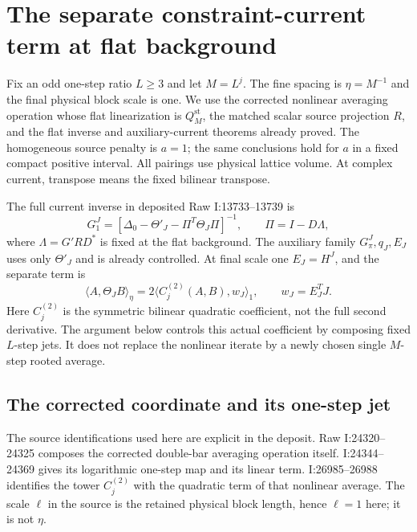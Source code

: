 \documentclass[11pt]{article}
\theoremstyle{remark}\newtheorem{remark}[theorem]{Remark}
\newcommand{\norm}[1]{\left\lVert#1\right\rVert}
\begin{document}

\section{The separate constraint-current term at flat background}
\label{fc-section}

Fix an odd one-step ratio $L\ge3$ and let $M=L^j$.
The fine spacing is $\eta=M^{-1}$ and the final physical block
scale is one. We use the corrected nonlinear averaging operation
whose flat linearization is $Q_M^{\mathrm{st}}$, the matched scalar
source projection $R$, and the flat inverse and auxiliary-current
theorems already proved. The homogeneous source penalty is $a=1$;
the same conclusions hold for $a$ in a fixed compact positive
interval. All pairings use physical lattice volume. At complex
current, transpose means the fixed bilinear transpose.

The full current inverse in deposited Raw I:13733--13739 is
\begin{equation}
 G_1^J=[\Delta_0-\Theta'_J-\Pi^T\Theta_J\Pi]^{-1},
 \qquad \Pi=I-D\Lambda,
 \label{fc-full-inverse-definition}
\end{equation}
where $\Lambda=G'RD^*$ is fixed at the flat background. The auxiliary
family $G_\pi^J,q_J,E_J$ uses only $\Theta'_J$ and is already
controlled. At final scale one $E_J=H^J$, and the separate term is
\begin{equation}
 \langle A,\Theta_J B\rangle_\eta
   =2\langle C_j^{(2)}(A,B),w_J\rangle_1,
 \qquad w_J=E_J^T J.
 \label{fc-constraint-form}
\end{equation}
Here $C_j^{(2)}$ is the symmetric bilinear quadratic coefficient,
not the full second derivative. The argument below controls this
actual coefficient by composing fixed $L$-step jets. It does not
replace the nonlinear iterate by a newly chosen single $M$-step
rooted average.

\subsection{The corrected coordinate and its one-step jet}
\label{fc-coordinate-section}

The source identifications used here are explicit in the deposit.
Raw I:24320--24325 composes the corrected double-bar averaging
operation itself. I:24344--24369 gives its logarithmic one-step
map and its linear term. I:26985--26988 identifies the tower
$C_j^{(2)}$ with the quadratic term of that nonlinear average.
The scale $\ell$ in the source is the retained physical block
length, hence $\ell=1$ here; it is not $\eta$.
\end{document}
